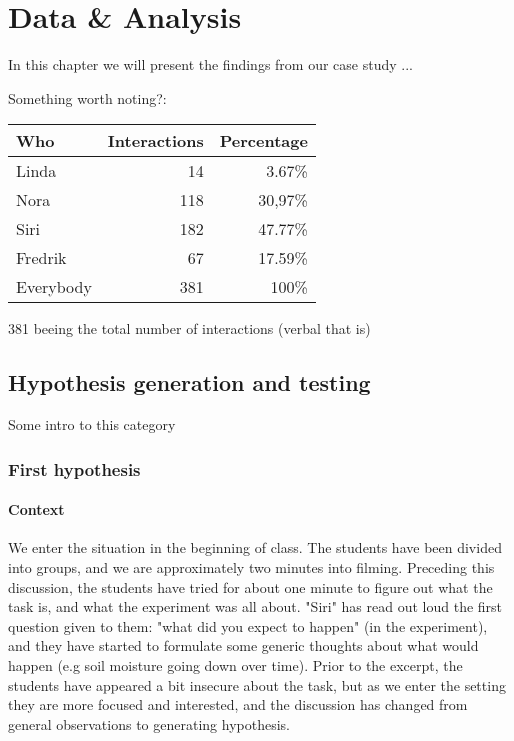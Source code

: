 \chapter{Data \& Analysis}
In this chapter we will present the findings from our case study ...

Something worth noting?:
\begin{table}[H]
\begin{center}
	\begin{tabular}{l r r } \toprule
	Who &  Interactions  & Percentage\\ \midrule  
	Linda &	 14  & 3.67\% \\
	Nora&	118 & 30,97\% \\ 
	Siri& 	182 & 47.77\% \\
	Fredrik& 67 & 17.59\% \\ \midrule
	Everybody &	381 & 100\%\\
	\bottomrule
	\end{tabular}
\end{center}
\end{table}
381 beeing the total number of interactions (verbal that is)



\section{Hypothesis generation and testing}
Some intro to this category
\subsection{First hypothesis}
\subsubsection*{Context}
\label{firsthypothesis}
We enter the situation in the beginning of class. The students have been divided into groups, and we are approximately two minutes into filming. Preceding this discussion, the students have tried for about one minute to figure out what the task is, and what the experiment was all about. "Siri" has read out loud the first question given to them: "what did you expect to happen" (in the experiment), and they have started to formulate some generic thoughts about what would happen (e.g soil moisture going down over time). Prior to the excerpt, the students have appeared a bit insecure about the task, but as we enter the setting they are more focused and interested, and the discussion has changed from general observations to generating hypothesis.

